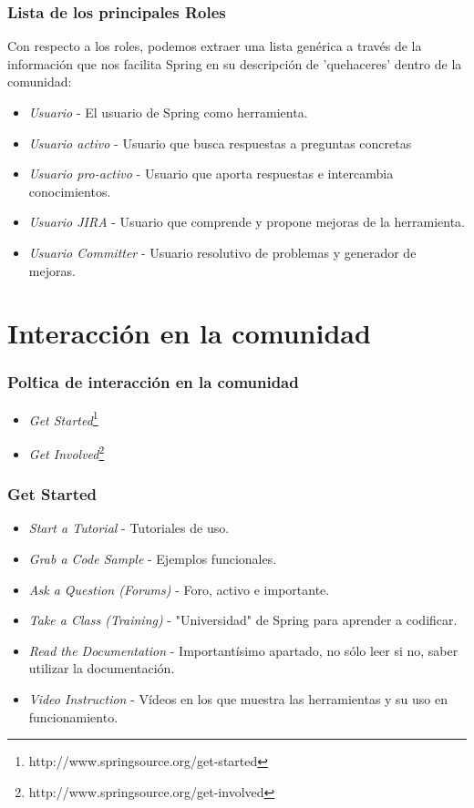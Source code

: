 \documentclass[xcolor=dvipsnames]{beamer}
\begin{document}
\begin{frame}[allowframebreaks]
\frametitle{Lista de los principales Roles}
Con respecto a los roles, podemos extraer una lista gen\'erica a trav\'es de la informaci\'on que nos facilita Spring en su descripci\'on de 'quehaceres' dentro de la comunidad:
\begin{itemize}
    \item \emph{Usuario} - El usuario de Spring como herramienta.
    \item \emph{Usuario activo} - Usuario que busca respuestas a preguntas concretas
    \item \emph{Usuario pro-activo} - Usuario que aporta respuestas e intercambia conocimientos.
    \item \emph{Usuario JIRA} - Usuario que comprende y propone mejoras de la herramienta.
    \item \emph{Usuario Committer} - Usuario resolutivo de problemas y generador de mejoras.
\end{itemize}
\end{frame}

\section{Interacci\'on en la comunidad}
\begin{frame}[allowframebreaks]
\frametitle{Pol\'tica de interacci\'on en la comunidad}
\begin{itemize}
    \item \emph{Get Started}\footnote{http://www.springsource.org/get-started}
    \item \emph{Get Involved}\footnote{http://www.springsource.org/get-involved}
\end{itemize}
\end{frame}

\begin{frame}[allowframebreaks]
\frametitle{Get Started}
\begin{itemize}
    \item \emph{Start a Tutorial} - Tutoriales de uso.
    \item \emph{Grab a Code Sample} - Ejemplos funcionales.
    \item \emph{Ask a Question (Forums)} - Foro, activo e importante.
    \item \emph{Take a Class (Training)} - "Universidad" de Spring para aprender a codificar.
    \item \emph{Read the Documentation} - Important\'isimo apartado, no s\'olo leer si no, saber utilizar la documentaci\'on.
    \item \emph{Video Instruction} - V\'ideos en los que muestra las herramientas y su uso en funcionamiento.
\end{itemize}
\end{frame}
\end{document}
